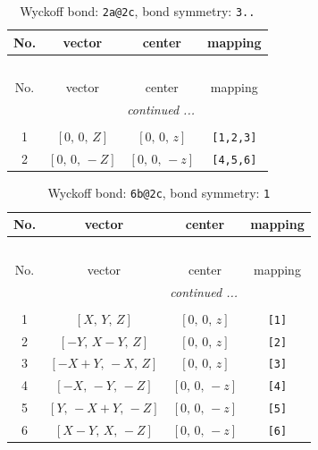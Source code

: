 \documentclass[fleqn,8pt]{jsarticle}
\begin{document}
\begin{longtable}{cccc}
\caption{Wyckoff bond: {\tt 2a@2c}, bond symmetry: {\tt 3..}}
 \\
 \hline \hline
No. & vector & center & mapping \\ \hline \endfirsthead

\multicolumn{3}{l}{\tablename\ \thetable{}} \\
 \hline \hline
No. & vector & center & mapping \\ \hline \endhead

 \hline \hline
\multicolumn{3}{r}{\footnotesize\it continued ...} \\ \endfoot

 \hline \hline
\multicolumn{3}{r}{} \\ \endlastfoot

1 & $\left[ 0,\, 0,\, Z \right]$ & $\left[ 0,\, 0,\, z \right]$ & {\tt [1,2,3]} \\ \hline
2 & $\left[ 0,\, 0,\, - Z \right]$ & $\left[ 0,\, 0,\, - z \right]$ & {\tt [4,5,6]} \\
\end{longtable}
\renewcommand{\arraystretch}{1.2}
\begin{longtable}{cccc}
\caption{Wyckoff bond: {\tt 6b@2c}, bond symmetry: {\tt 1}}
 \\
 \hline \hline
No. & vector & center & mapping \\ \hline \endfirsthead

\multicolumn{3}{l}{\tablename\ \thetable{}} \\
 \hline \hline
No. & vector & center & mapping \\ \hline \endhead

 \hline \hline
\multicolumn{3}{r}{\footnotesize\it continued ...} \\ \endfoot

 \hline \hline
\multicolumn{3}{r}{} \\ \endlastfoot

1 & $\left[ X,\, Y,\, Z \right]$ & $\left[ 0,\, 0,\, z \right]$ & {\tt [1]} \\ \hline
2 & $\left[ - Y,\, X - Y,\, Z \right]$ & $\left[ 0,\, 0,\, z \right]$ & {\tt [2]} \\ \hline
3 & $\left[ - X + Y,\, - X,\, Z \right]$ & $\left[ 0,\, 0,\, z \right]$ & {\tt [3]} \\ \hline
4 & $\left[ - X,\, - Y,\, - Z \right]$ & $\left[ 0,\, 0,\, - z \right]$ & {\tt [4]} \\ \hline
5 & $\left[ Y,\, - X + Y,\, - Z \right]$ & $\left[ 0,\, 0,\, - z \right]$ & {\tt [5]} \\ \hline
6 & $\left[ X - Y,\, X,\, - Z \right]$ & $\left[ 0,\, 0,\, - z \right]$ & {\tt [6]} \\
\end{longtable}
\end{document}
